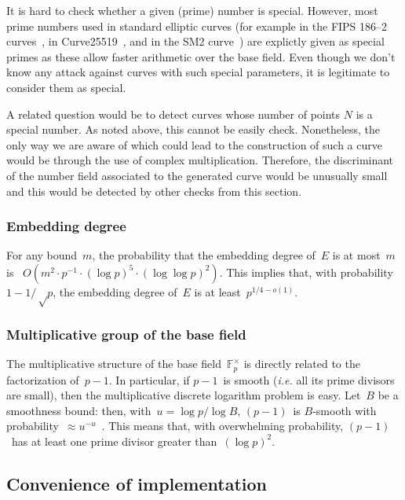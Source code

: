\documentclass[twocolumn,letterpaper]{article}
\def\F{\mathbb{F}}
\begin{document}
It is hard to check whether a given (prime) number is special.
However, most prime numbers used in standard elliptic curves
(for example in the FIPS 186--2 curves~\cite{nist2000fips186-2},
in Curve25519~\cite{pkc2006bernstein},
and in the SM2 curve~\cite{oscca2010sm2})
are explictly given as special primes as these allow faster arithmetic
over the base field.
Even though we don't know any attack against curves with such special
parameters, it is legitimate to consider them as special.

A related question would be to detect curves whose number of points $N$
is a special number.
As noted above, this cannot be easily check.
Nonetheless, the only way we are aware of which could lead to the construction
of such a curve would be through the use of complex multiplication.
Therefore, the discriminant of the number field associated
to the generated curve would be unusually small and this would be detected by
other checks from this section.

\subsubsection{Embedding degree}

For any bound~$m$, the probability that
the embedding degree of~$E$ is at most~$m$
is~\cite{jc1998bk} $O(m^2 · p^{-1}·(\log p)^5·(\log\log p)^2)$.
This implies that, with probability~$1 - 1/√p$,
the embedding degree of~$E$ is at least~$p^{1/4 - o(1)}$.

\subsubsection{Multiplicative group of the base field}

The multiplicative structure of the base field~$\F_p^{×}$
is directly related to the factorization of~$p-1$.
In particular, if $p-1$~is smooth
(\emph{i.e.} all its prime divisors are small),
then the multiplicative discrete logarithm problem is easy.
Let~$B$ be a smoothness bound: then, with~$u = \log p / \log B$,
$(p-1)$~is $B$-smooth with probability~$≈ u^{-u}$~\cite{jnt1983cep}.
This means that, with overwhelming probability,
$(p-1)$~has at least one prime divisor greater than~$(\log p)^2$.

\subsection{Convenience of implementation}
\label{ss:convenience}
\end{document}
